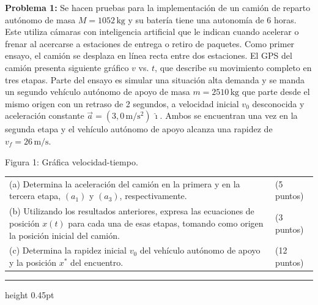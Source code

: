 \documentclass[9pt]{article}
\newcommand{\problem}[1]{\textbf{Problema #1:}}
\newcommand{\vect}[1]{\vec{#1}}
\newcommand{\tightline}{\vspace{0.55mm}\hrule height 0.45pt\vspace{0.75mm}}
\begin{document}
\begin{minipage}[t]{0.59\textwidth}
\justifying
\problem{1} Se hacen pruebas para la implementación de un camión de reparto autónomo de masa $M=1052\,\mathrm{kg}$ y su batería tiene una autonomía de 6 horas. Este utiliza cámaras con inteligencia artificial que le indican cuando acelerar o frenar al acercarse a estaciones de entrega o retiro de paquetes. Como primer ensayo, el camión se desplaza en línea recta entre dos estaciones. El GPS del camión presenta siguiente gráfico $v$ vs. $t$, que describe su movimiento completo en tres etapas. Parte del ensayo es simular una situación alta demanda y se manda un segundo vehículo autónomo de apoyo de masa $m=2510\,\mathrm{kg}$ que parte desde el mismo origen con un retraso de 2 segundos, a velocidad inicial $v_0$ desconocida y aceleración constante $\vect{a}=(3{,}0\,\mathrm{m/s^2})\,\hat{\imath}$. Ambos se encuentran una vez en la segunda etapa y el vehículo autónomo de apoyo alcanza una rapidez de $v_f=26\,\mathrm{m/s}$.
\end{minipage}\hfill
\begin{minipage}[t]{0.385\textwidth}
\centering
\vspace{-0.5mm}
\vspace{-0.7mm}

{\fontsize{8.2}{8.7}\selectfont Figura 1: Gráfica velocidad-tiempo.}
\end{minipage}

\vspace{0.55mm}
\begin{tabularx}{\textwidth}{@{}>{\raggedright\arraybackslash}X>{\raggedleft\arraybackslash}p{25mm}@{}}
(a) Determina la aceleración del camión en la primera y en la tercera etapa, $(a_1)$ y $(a_3)$, respectivamente. & (5 puntos)\\[-0.15mm]
(b) Utilizando los resultados anteriores, expresa las ecuaciones de posición $x(t)$ para cada una de esas etapas, tomando como origen la posición inicial del camión. & (3 puntos)\\[-0.15mm]
(c) Determina la rapidez inicial $v_0$ del vehículo autónomo de apoyo y la posición $x^{*}$ del encuentro. & (12 puntos)
\end{tabularx}
\tightline
\end{document}
